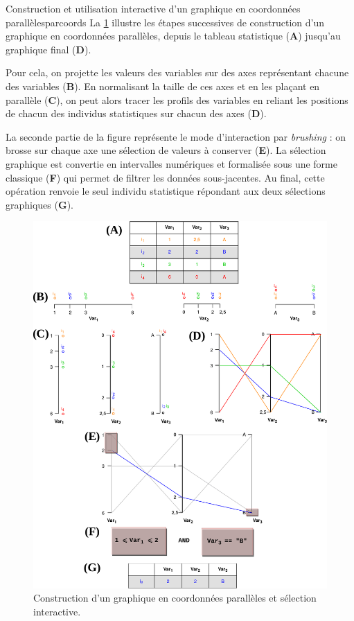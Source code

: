 \begin{encadre}{Construction et utilisation interactive d'un graphique en coordonnées parallèles}{parcoords}
	\renewcommand{\thempfootnote}{\alph{mpfootnote}}	
	La \cref{fig:schema_parcoords} illustre les étapes successives de construction d'un graphique en coordonnées parallèles, depuis le tableau statistique (\textbf{A}) jusqu'au graphique final (\textbf{D}).
	
	Pour cela, on projette les valeurs des variables sur des axes représentant chacune des variables (\textbf{B}).
	En normalisant la taille de ces axes et en les plaçant en parallèle (\textbf{C}), on peut alors tracer les \og profils\fg{} des variables en reliant les positions de chacun des individus statistiques sur chacun des axes (\textbf{D}).
	
	La seconde partie de la figure représente le mode d'interaction par \textit{brushing} : on \og brosse\fg{} sur chaque axe une sélection de valeurs à conserver (\textbf{E}).
	La sélection graphique est convertie en intervalles numériques et formalisée sous une forme classique (\textbf{F}) qui permet de filtrer les données sous-jacentes.
	Au final, cette opération renvoie le seul individu statistique répondant aux deux sélections graphiques (\textbf{G}).
	
	\begin{figure}[H]
		\centering
		\captionsetup{width=\linewidth}
		\includegraphics[width=.94\linewidth]{img/ParCoords_Brush.pdf}
		\caption{Construction d'un graphique en coordonnées parallèles et sélection interactive.\vspace{.1cm}}
		\label{fig:schema_parcoords}
	\end{figure}
	\medskip
\end{encadre}

